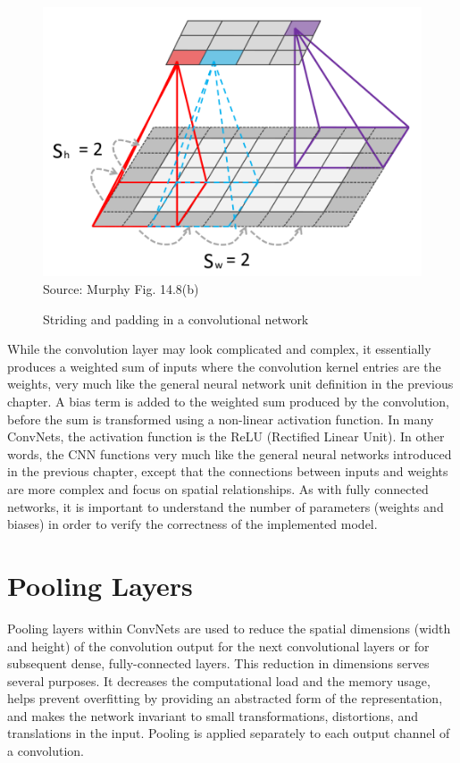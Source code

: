 \begin{figure}
\centering
\includegraphics[width=.66\textwidth]{screen4.png} \\

\scriptsize Source: Murphy Fig. 14.8(b)
\caption{Striding and padding in a convolutional network}
\label{fig:screen4_chap16}
\end{figure}

While the convolution layer may look complicated and complex, it essentially produces a weighted sum of inputs where the convolution kernel entries are the weights, very much like the general neural network unit definition in the previous chapter. A bias term is added to the weighted sum produced by the convolution, before the sum is transformed using a non-linear activation function. In many ConvNets, the activation function is the ReLU (Rectified Linear Unit). In other words, the CNN functions very much like the general neural networks introduced in the previous chapter, except that the connections between inputs and weights are more complex and focus on spatial relationships. As with fully connected networks, it is important to understand the number of parameters (weights and biases) in order to verify the correctness of the implemented model.

\section{Pooling Layers}

Pooling layers within ConvNets are used to reduce the spatial dimensions (width and height) of the convolution output for the next convolutional layers or for subsequent dense, fully-connected layers. This reduction in dimensions serves several purposes. It decreases the computational load and the memory usage, helps prevent overfitting by providing an abstracted form of the representation, and makes the network invariant to small transformations, distortions, and translations in the input. Pooling is applied separately to each output channel of a convolution.


